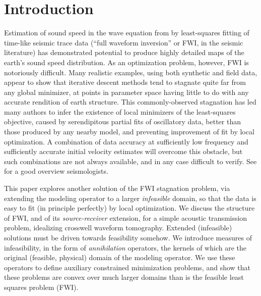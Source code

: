 \section{Introduction}
Estimation of sound speed in the wave equation from by least-squares
fitting of time-like seismic trace data (``full waveform inversion''
or FWI, in the seismic literature) has demonstrated potential to
produce highly detailed maps of the earth's sound speed
distribution. As an optimization problem, however, FWI is notoriously
difficult. Many realistic examples, using both synthetic and field
data, appear to show that iterative descent methods tend to stagnate
quite far from any global minimizer, at points in parameter space
having little to do with any accurate rendition of earth
structure. This commonly-observed stagnation has led many authors to
infer the existence of local minimizers of the least-squares
objective, caused by serendipitous partial fits of oscillatory data,
better than those produced by any nearby model, and preventing
improvement of fit by local optimization. A combination of data accuracy
at sufficiently low frequency and sufficiently accurate initial
velocity estimates will overcome this obstacle, but such combinations
are not always available, and in any case difficult to verify.
See \cite{VirieuxOperto:09} for a good overview
seismologists.

This paper explores another solution of the FWI stagnation problem,
via extending the modeling operator to a larger  {\em infeasible} domain, so that the
data is easy to fit (in principle perfectly) by local optimization. We discuss the structure of FWI, and of its
{\em source-receiver} extension, for a simple acoustic transmission
problem, idealizing crosswell waveform tomography. Extended
(infeasible) solutions must be driven towards feasibility somehow.
We introduce measures of infeasibility, in the form of {\em
  annihilation} operators, the kernels of which are the original (feasible, physical)
domain of the modeling operator. We use these operators to define
auxiliary constrained minimization problems, and show that these
problems are convex over much larger domains than is the feasible
least squares problem (FWI).


